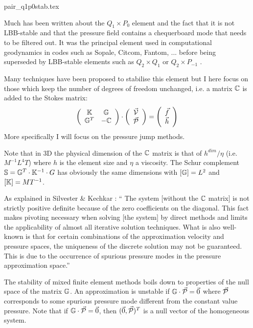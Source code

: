 \begin{flushright} {\tiny {\color{gray} pair\_q1p0stab.tex}} \end{flushright}
Much has been written about the $Q_1\times P_0$ element and the fact that it is not LBB-stable and that the pressure field contains a chequerboard mode that needs to be filtered out. 
It was the principal element used in computational geodynamics in codes such as Sopale, Citcom, Fantom, ... before being 
superseded by LBB-stable elements such as $Q_2\times Q_1$ or $Q_2\times P_{-1}$ \cite{thba22}.

Many techniques have been proposed to stabilise this element but I here focus on those which keep the number of degrees of freedom unchanged, i.e. a matrix ${\mathbb{C}}$ is added to the Stokes matrix:
\[
\left(
\begin{array}{cc}
{\mathbb{K}} & {\mathbb{G}} \\
{\mathbb{G}}^T & -{\mathbb{C}} 
\end{array}
\right)
\cdot
\left(
\begin{array}{c}
\vec{\cal V} \\
\vec{\cal P}
\end{array}
\right)
=
\left(
\begin{array}{c}
\vec{f} \\
\vec{h}
\end{array}
\right)
\]
More specifically I will focus on the pressure jump methods.

Note that in 3D the physical dimension of the ${\mathbb{C}}$ matrix is that of $h^{dim}/\eta$ (i.e. $M^{-1}L^4T$) where $h$ is the element size and $\eta$ a viscosity. The Schur complement ${\mathbb{S}}={\mathbb{G}}^T\cdot {\mathbb{K}}^{-1} \cdot G$ has obviously the same dimensions with $[{\mathbb{G}}]=L^2$ and $[{\mathbb{K}}]=MT^{-1}$.

As explained in Silvester \& Kechkar \cite{sike90}: ``
The system [without the ${\mathbb{C}}$ matrix] is not strictly positive definite because of the zero coefficients on the
diagonal. This fact makes pivoting necessary when solving [the system] by direct methods and limits the applicability of almost all iterative solution techniques. What is also well-known is that for certain combinations of the approximation velocity and pressure spaces, the uniqueness of the discrete solution may not be guaranteed. This is due to the occurrence of spurious pressure modes in the pressure approximation space.''

The stability of mixed finite element methods boils down to properties of the null space of the matrix ${\mathbb{G}}$. 
An approximation is unstable if ${\mathbb{G}} \cdot \vec{\cal P} = \vec{0}$ where $\vec{\cal P}$ corresponds to some spurious pressure mode different from the constant value pressure. Note that if ${\mathbb{G}}\cdot \vec{\cal P} = \vec{0}$, then $(\vec{0},\vec{\cal P})^T$ is a null vector of  
the homogeneous system. 

